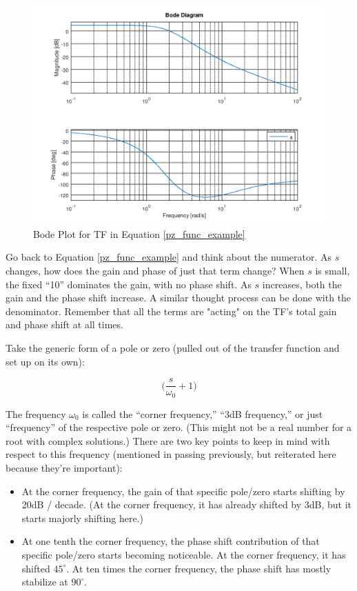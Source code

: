 \begin{figure}[h]
\centering
\includegraphics[scale=0.5]{pz_example_bode.png}
\caption{Bode Plot for TF in Equation \ref{pz_func_example}}\label{pz_ex_bode}
\end{figure}

Go back to Equation \ref{pz_func_example} and think about the numerator. As $s$ changes, how does the gain and phase of just that term change? When $s$ is small, the fixed ``10'' dominates the gain, with no phase shift. As $s$ increases, both the gain and the phase shift increase. A similar thought process can be done with the denominator. Remember that all the terms are "acting" on the TF's total gain and phase shift at all times.

Take the generic form of a pole or zero (pulled out of the transfer function and set up on its own):

\begin{equation}
\bigg(\frac{s}{\omega_0} + 1\bigg)
\end{equation}

The frequency $\omega_0$ is called the ``corner frequency,'' ``3dB frequency,'' or just ``frequency'' of the respective pole or zero. (This might not be a real number for a root with complex solutions.) There are two key points to keep in mind with respect to this frequency (mentioned in passing previously, but reiterated here because they're important):

\begin{itemize}
\item At the corner frequency, the gain of that specific pole/zero starts shifting by 20dB / decade. (At the corner frequency, it has already shifted by 3dB, but it starts majorly shifting here.)
\item At one tenth the corner frequency, the phase shift contribution of that specific pole/zero starts becoming noticeable. At the corner frequency, it has shifted $45^{\circ}$. At ten times the corner frequency, the phase shift has mostly stabilize at $90^{\circ}$.
\end{itemize}

